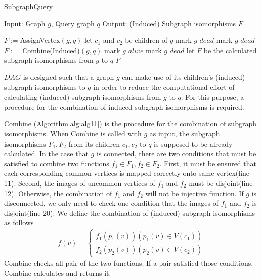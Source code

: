 \begin{algorithm}[t]
\caption{SubgraphQuery}
\label{alg:alg5}
\begin{algorithmic}
\STATE Input: Graph $g$, Query graph $q$
\STATE Output: (Induced) Subgraph isomorphisms $F$
\end{algorithmic}
\begin{algorithmic}[1]
		\STATE $F:=$AssignVertex$(g,q)$
	\ELSE
		\STATE let $c_1$ and $c_2$ be children of $g$
			\STATE mark $g$ $dead$
			\STATE mark $g$ $dead$
		\ELSE
			\STATE $F :=$ Combine(Induced)$(g,q)$
		\ENDIF
	\ENDIF
		\STATE mark $g$ $alive$
	\ELSE
		\STATE mark $g$ $dead$
	\ENDIF
\ELSE
	\STATE let $F$ be the calculated subgraph isomorphisms from $g$ to $q$
\ENDIF
\RETURN $F$
\end{algorithmic}
\end{algorithm}

$DAG$ is designed such that a graph $g$ can make use of its children's (induced) subgraph isomorphisms to $q$ in order to reduce the computational effort of calculating (induced) subgraph isomorphisms from $g$ to $q$.
For this purpose, a procedure for the combination of induced subgraph isomorphisms is required.

Combine (Algorithm\ref{alg:alg11}) is the procedure for the combination of subgraph isomorphisms.
When Combine is called with $g$ as input, the subgraph isomorphisms $F_1, F_2$ from its children $c_1, c_2$ to $q$ is supposed to be already calculated.
In the case that $g$ is connected, there are two conditions that must be satisfied to combine two functions $f_1 \in F_1, f_2 \in F_2$.
First, it must be ensured that each corresponding common vertices is mapped correctly onto same vertex(line 11).
Second, the images of uncommon vertices of $f_1$ and $f_2$ must be disjoint(line 12).
Otherwise, the combination of $f_1$ and $f_2$ will not be injective function.
If $g$ is disconnected, we only need to check one condition that the images of $f_1$ and $f_2$ is disjoint(line 20).
We define the combination of (induced) subgraph isomorphisms as follows
\begin{eqnarray}
\label{eq:eq1}
f(v) = \left\{
\begin{array}{l}
f_1(p_1(v)) (p_1(v) \in V(c_1))\\
f_2(p_2(v)) (p_2(v) \in V(c_2))
\end{array}
\right.
\end{eqnarray} 
Combine checks all pair of the two functions.
If a pair satisfied those conditions, Combine calculates and returns it.

